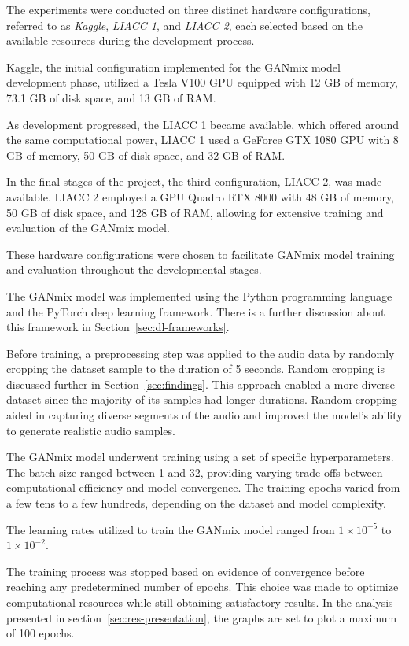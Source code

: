 The experiments were conducted on three distinct hardware configurations, referred to as \textit{Kaggle}, \textit{\ac{LIACC} 1}, and \textit{\ac{LIACC} 2}, each selected based on the available resources during the development process.

Kaggle, the initial configuration implemented for the GANmix model development phase, utilized a Tesla V100 \ac{GPU} equipped with 12 \ac{GB} of memory, 73.1 \ac{GB} of disk space, and 13 \ac{GB} of \ac{RAM}.

As development progressed, the \ac{LIACC} 1 became available, which offered around the same computational power, \ac{LIACC} 1 used a GeForce GTX 1080 \ac{GPU} with 8 \ac{GB} of memory, 50 \ac{GB} of disk space, and 32 \ac{GB} of \ac{RAM}.

In the final stages of the project, the third configuration, \ac{LIACC} 2, was made available. \ac{LIACC} 2 employed a \ac{GPU} Quadro RTX 8000 with 48 \ac{GB} of memory, 50 \ac{GB} of disk space, and 128 \ac{GB} of \ac{RAM}, allowing for extensive training and evaluation of the GANmix model.

These hardware configurations were chosen to facilitate GANmix model training and evaluation throughout the developmental stages.

The GANmix model was implemented using the Python programming language and the PyTorch deep learning framework. There is a further discussion about this framework in Section~\ref{sec:dl-frameworks}.

Before training, a preprocessing step was applied to the audio data by randomly cropping the dataset sample to the duration of 5 seconds. Random cropping is discussed further in Section~\ref{sec:findings}. This approach enabled a more diverse dataset since the majority of its samples had longer durations. Random cropping aided in capturing diverse segments of the audio and improved the model's ability to generate realistic audio samples.

The GANmix model underwent training using a set of specific hyperparameters. The batch size ranged between 1 and 32, providing varying trade-offs between computational efficiency and model convergence. The training epochs varied from a few tens to a few hundreds, depending on the dataset and model complexity. 

The learning rates utilized to train the GANmix model ranged from $1 \times 10^{-5}$ to $1 \times 10^{-2}$.

The training process was stopped based on evidence of convergence before reaching any predetermined number of epochs. This choice was made to optimize computational resources while still obtaining satisfactory results. In the analysis presented in section~\ref{sec:res-presentation}, the graphs are set to plot a maximum of 100 epochs.